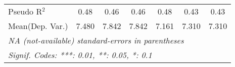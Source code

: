 \begin{tabular}{lcccccc}
   Pseudo R$^2$                                                               & 0.48                   & 0.46                   & 0.46                   & 0.48  & 0.43                   & 0.43\\  
Mean(Dep. Var.) & 7.480 & 7.842 & 7.842 & 7.161 & 7.310 & 7.310 \\
   \midrule \midrule
   \multicolumn{7}{l}{\emph{NA (not-available) standard-errors in parentheses}}\\
   \multicolumn{7}{l}{\emph{Signif. Codes: ***: 0.01, **: 0.05, *: 0.1}}\\
\end{tabular}
\par\endgroup

